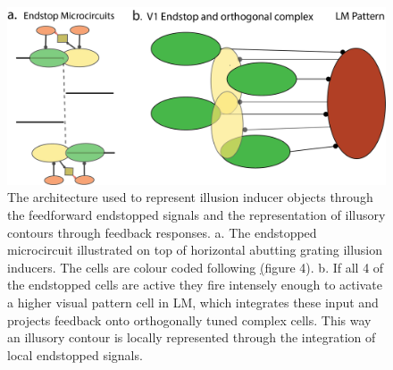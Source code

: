 \documentclass[12pt]{article}
\begin{document}
\vspace{20pt}
\begin{figure}[H]
  \centering
  \includegraphics[width=1 \textwidth]{adjusted_figures/illusory_filling.png}
  \caption{The architecture used to represent illusion inducer objects through the feedforward endstopped signals and the representation of illusory contours through feedback responses. a. The endstopped microcircuit illustrated on top of horizontal abutting grating illusion inducers. The cells are colour coded following \hyperref[fig:LIF_Overview](figure 4). b. If all 4 of the endstopped cells are active they fire intensely enough to activate a higher visual pattern cell in LM, which integrates these input and projects feedback onto orthogonally tuned complex cells. This way an illusory contour is locally represented through the integration of local endstopped signals.}
  \label{fig:illusory_filling}
\end{figure}
\newpage
\end{document}
